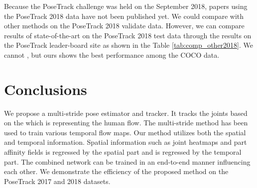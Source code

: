 \documentclass[conference]{IEEEtran}
\begin{document}
Because the PoseTrack challenge was held on the September 2018, papers using the PoseTrack 2018 data have not been published yet. We could  compare  with other methods on the PoseTrack 2018 validate data. However, we can compare results of state-of-the-art on the PoseTrack 2018 test data through the results on the PoseTrack leader-board site as shown in the Table \ref{tab:comp_other2018}. We cannot , but ours shows the best performance among the   COCO data.


















\section{Conclusions}

We propose a multi-stride pose estimator and tracker. It tracks the joints based on the 
which is  representing the human flow. 
The multi-stride method has been used to train various temporal flow maps. 
Our method utilizes both the spatial and temporal information.
Spatial information such as joint heatmaps and part affinity fields is regressed by the spatial part and 
is regressed by the temporal part. 
The combined network can be trained in an end-to-end manner influencing each other.
We demonstrate the efficiency of the proposed method on the PoseTrack 2017 and 2018 datasets.









{\small




}
\end{document}

